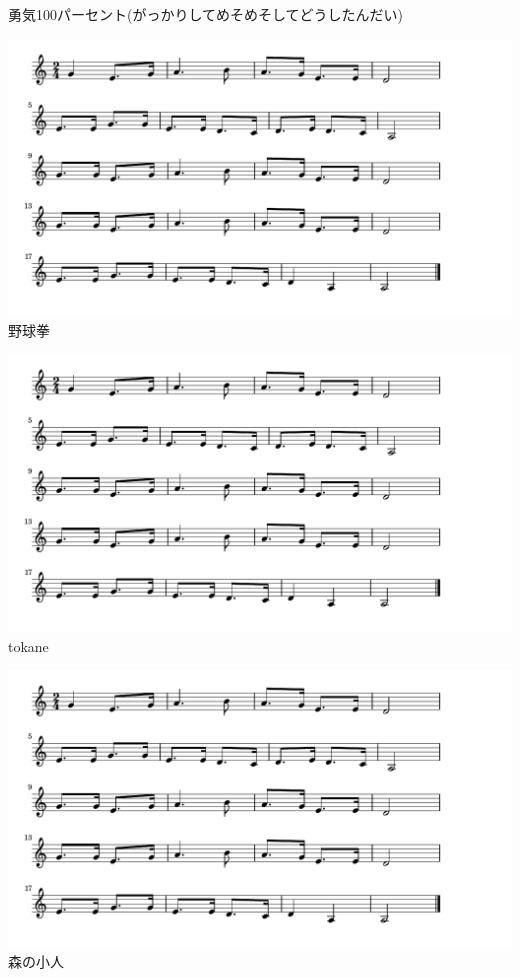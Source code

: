 \documentclass[a4paper]{ltjsarticle}
\begin{document}
勇気100パーセント(がっかりしてめそめそしてどうしたんだい)

\includegraphics[]{yakyuken_crop.pdf}
野球拳

\includegraphics[clip]{yakyuken_crop.pdf}
tokane

\includegraphics[clip]{yakyuken_crop.pdf}
森の小人
\end{document}
